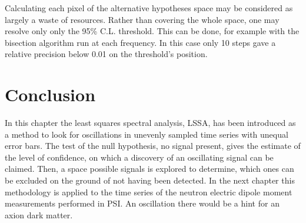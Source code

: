 Calculating each pixel of the alternative hypotheses space may be considered as largely a waste of resources. Rather than covering the whole space, one may resolve only only the 95\% C.L. threshold. This can be done, for example with the bisection algorithm run at each frequency. In this case only 10 steps gave a relative precision below 0.01 on the threshold's position.



\section{Conclusion}
In this chapter the least squares spectral analysis, LSSA, has been introduced as a method to look for oscillations in unevenly sampled time series with unequal error bars. The test of the null hypothesis, no signal present, gives the estimate of the level of confidence, on which a discovery of an oscillating signal can be claimed. Then, a space possible signals is explored to determine, which ones can be excluded on the ground of not having been detected. In the next chapter this methodology is applied to the time series of the neutron electric dipole moment measurements performed in PSI\@. An oscillation there would be a hint for an axion dark matter.
